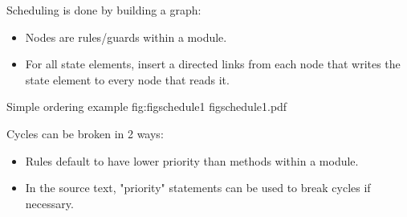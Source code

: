Scheduling is done by building a graph:
\begin{itemize}
\item Nodes are rules/guards within a module.
\item For all state elements, insert a directed links from each node that writes the state element to every node that reads it.
\end{itemize}

\begin{importgraphic}
{Simple ordering example}
{fig:figschedule1}
{figschedule1.pdf}
\end{importgraphic}

Cycles can be broken in 2 ways:
\begin{itemize}
\item Rules default to have lower priority than methods within a module.
\item In the source text, "priority" statements can be used to break cycles if necessary.
\end{itemize}

